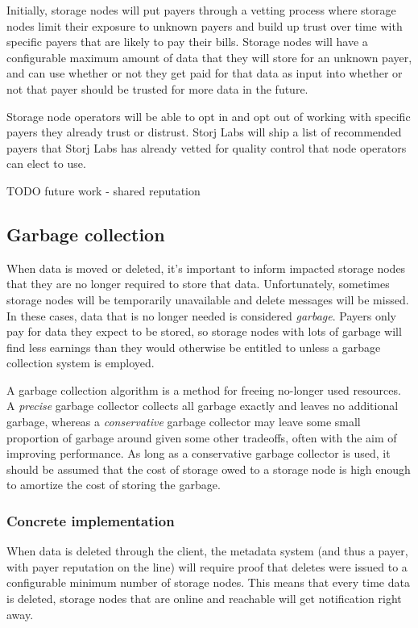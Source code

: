 \documentclass[a4paper,10pt]{article} \usepackage[utf8]{inputenc}
\newcommand{\todo}[1]{{\color{red} TODO #1 }}
\begin{document}
Initially, storage nodes will put payers through a vetting process
where storage nodes limit their exposure to unknown payers and build up trust
over time with specific payers that are likely to pay their bills. 
Storage nodes
will have a configurable maximum amount of data that they will store for an
unknown payer, and can use whether or not they get paid for that data 
as input into
whether or not that payer should be trusted for more data in the future.

Storage node operators will be able to opt in and opt out of working with specific payers they already 
trust or distrust. 
Storj Labs will ship a list of recommended payers that
Storj Labs has already vetted for quality control that
node operators can elect to use.

\todo{future work - shared reputation}

\subsection{Garbage collection}

When data is moved or deleted, it's important to inform impacted storage nodes
that they are no longer required to store that data. Unfortunately, sometimes
storage nodes will be temporarily unavailable and delete messages will be
missed. In these cases, data that is no longer needed is considered
{\em garbage}. Payers only pay for data they expect to be stored, so storage
nodes with lots of garbage will find less earnings than they would
otherwise be entitled to unless a garbage collection system is employed.

A garbage collection algorithm is a method for freeing no-longer used resources.
A {\em precise} garbage collector collects all garbage exactly and
leaves no additional garbage, whereas a {\em conservative} garbage collector may
leave some small proportion of garbage around given some other tradeoffs, 
often with the aim of improving performance. 
As long as a conservative garbage collector is used, it should
be assumed that the cost of storage owed to a storage node is high enough
to amortize the cost of storing the garbage.

\subsubsection{Concrete implementation}

When data is deleted through the client, the metadata system (and thus a payer,
with payer reputation on the line) will require proof that deletes were issued
to a configurable minimum number of storage nodes. This means that every time
data is deleted, storage nodes that are online and reachable will get
notification right away.
\end{document}
